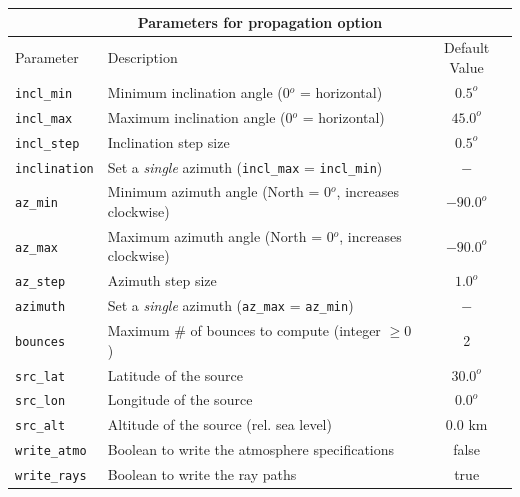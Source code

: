 \documentclass[10pt]{article}
\begin{document}
\begin{tabular}{ | l | l | c | }
  \hline
  \multicolumn{3}{|c|}{\textbf{Parameters for propagation option}} \\
  \hline
  Parameter & Description & Default Value \\
  \hline \hline
 \verb=incl_min= 		& Minimum inclination angle (0\(^o\) = horizontal)					& \(0.5^o\)	\\
 \verb=incl_max= 		& Maximum inclination angle (0\(^o\) = horizontal)					& \(45.0^o\) \\
 \verb=incl_step=  		& Inclination step size										& \(0.5^o\) \\ 
 \verb=inclination=  		& Set a \textit{single} azimuth  (\verb#incl_max# = \verb#incl_min#)		& \(-\) \\ \hline
 \verb=az_min= 		& Minimum azimuth angle (North = 0\(^o\), increases clockwise)		& \(-90.0^o\)	\\
 \verb=az_max= 		& Maximum azimuth angle (North = 0\(^o\), increases clockwise)		& \(-90.0^o\) \\
 \verb=az_step=  		& Azimuth step size											& \(1.0^o\) \\ 
 \verb=azimuth=		& Set a \textit{single} azimuth  (\verb#az_max# = \verb#az_min#)		& \(-\) \\ \hline
 \verb=bounces=		& Maximum \# of bounces to compute (integer \(\geq 0\)) 				& 2 \\ \hline
 \verb=src_lat= 			& Latitude of the source 										& \(30.0^o\) \\
 \verb=src_lon= 		& Longitude of the source										& \(0.0^o\) \\
 \verb=src_alt=  		& Altitude of the source (rel. sea level)							& \(0.0\) km \\ \hline
 \verb=write_atmo=		& Boolean to write the atmosphere specifications					& false \\
 \verb=write_rays=		& Boolean to write the ray paths								& true \\  \hline
\end{tabular}

 \vspace{0.01\textheight}
\end{document}
